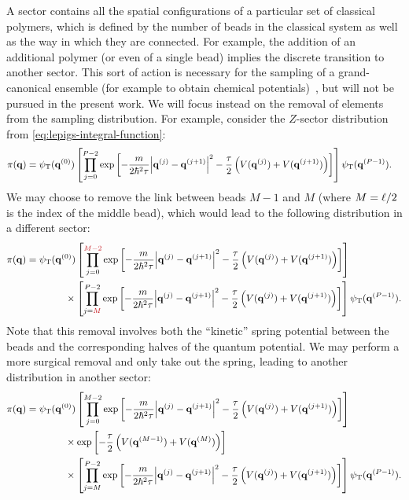 A sector contains all the spatial configurations of a particular set of classical polymers, which is defined by the number of beads in the classical system as well as the way in which they are connected.
For example, the addition of an additional polymer (or even of a single bead) implies the discrete transition to another sector.
This sort of action is necessary for the sampling of a grand-canonical ensemble (for example to obtain chemical potentials)~\cite{herdman2014quantum}, but will not be pursued in the present work.
We will focus instead on the removal of elements from the sampling distribution.
For example, consider the $Z$-sector distribution from \cref{eq:lepigs-integral-function}:
\begin{align}
	\pi(\bm{\mathbf{q}})
	&= \psi_\mathrm{T}(\bm{\mathbf{q}}^{(0)})
		\left[ \prod_{j=0}^{P-2} \exp{\left[ 
			-\frac{m}{2 \hbar^2 \tau} \abs{\bm{\mathbf{q}}^{(j)} - \bm{\mathbf{q}}^{(j+1)}}^2
			- \frac{\tau}{2} \left( V(\bm{\mathbf{q}}^{(j)}) + V(\bm{\mathbf{q}}^{(j+1)}) \right)
		 \right]} \right]
		\psi_\mathrm{T}(\bm{\mathbf{q}}^{(P-1)}).
			\label{eq:ugly-distribution1}
\end{align}
We may choose to remove the link between beads $M-1$ and $M$ (where $M = \ell / 2$ is the index of the middle bead), which would lead to the following distribution in a different sector:
\begin{align}
	\pi(\vec{q})
	&= \psiT(\vec{q}\bead{0})
		\left[ \prod_{j=0}^{\red{M-2}} \expb{
			-\frac{m}{2 \hbar^2 \tau} \abs{\vec{q}\bead{j} - \vec{q}\bead{j+1}}^2
			- \frac{\tau}{2} \left( V(\vec{q}\bead{j}) + V(\vec{q}\bead{j+1}) \right)
		} \right] \notag \\
	&\qquad\qquad\times
		\left[ \prod_{j=\red{M}}^{P-2} \expb{
			-\frac{m}{2 \hbar^2 \tau} \abs{\vec{q}\bead{j} - \vec{q}\bead{j+1}}^2
			- \frac{\tau}{2} \left( V(\vec{q}\bead{j}) + V(\vec{q}\bead{j+1}) \right)
		} \right]
		\psiT(\vec{q}\bead{P-1}).
			\label{eq:ugly-distribution2}
\end{align}
Note that this removal involves both the ``kinetic'' spring potential between the beads and the corresponding halves of the quantum potential.
We may perform a more surgical removal and only take out the spring, leading to another distribution in another sector:
\begin{align}
	\pi(\bm{\mathbf{q}})
	&= \psi_\mathrm{T}(\bm{\mathbf{q}}^{(0)})
		\left[ \prod_{j=0}^{M-2} \exp{\left[ 
			-\frac{m}{2 \hbar^2 \tau} \abs{\bm{\mathbf{q}}^{(j)} - \bm{\mathbf{q}}^{(j+1)}}^2
			- \frac{\tau}{2} \left( V(\bm{\mathbf{q}}^{(j)}) + V(\bm{\mathbf{q}}^{(j+1)}) \right)
		 \right]} \right] \notag \\
	&\qquad\qquad\times
		\exp{\left[ -\frac{\tau}{2} \left( V(\bm{\mathbf{q}}^{(M-1)}) + V(\bm{\mathbf{q}}^{(M)}) \right) \right]} \notag \\
	&\qquad\qquad\times
		\left[ \prod_{j=M}^{P-2} \exp{\left[ 
			-\frac{m}{2 \hbar^2 \tau} \abs{\bm{\mathbf{q}}^{(j)} - \bm{\mathbf{q}}^{(j+1)}}^2
			- \frac{\tau}{2} \left( V(\bm{\mathbf{q}}^{(j)}) + V(\bm{\mathbf{q}}^{(j+1)}) \right)
		 \right]} \right]
		\psi_\mathrm{T}(\bm{\mathbf{q}}^{(P-1)}).
			\label{eq:ugly-distribution3}
\end{align}

